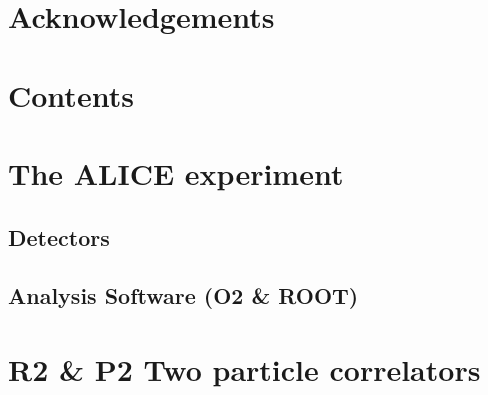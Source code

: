 \documentclass[ALICE,manyauthors]{ALICE_analysis_notes}
\begin{document}
\section{Acknowledgements}
\section{Contents}%
\section{The ALICE experiment}
\subsection{Detectors}
\subsection{Analysis Software (O2 \& ROOT)}
\section{R2 \& P2 Two particle correlators}

\end{document}
